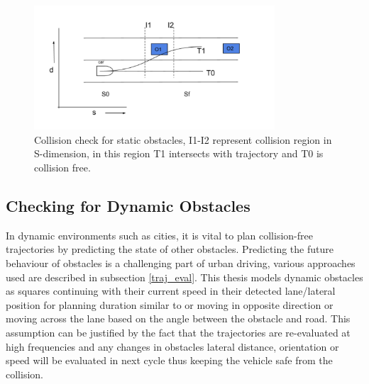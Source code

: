  \begin{figure}
    \centering
    \includegraphics[width=0.8\textwidth]{Images/static_check.png}
    \caption{Collision check for static obstacles, I1-I2 represent collision region in S-dimension, in this region T1 intersects with trajectory and T0 is collision free.}
    \label{static_check}
\end{figure}



\subsection{Checking for Dynamic Obstacles} \label{obstacle_check_dynamic}

In dynamic environments such as cities, it is vital to plan collision-free trajectories by predicting the state of other obstacles. Predicting the future behaviour of obstacles is a challenging part of urban driving, various approaches used are described in subsection \ref{traj_eval}. This thesis models dynamic obstacles as squares continuing with their current speed in their detected lane/lateral position for planning duration similar to \cite{unit_A_star} or moving in opposite direction or moving across the lane based on the angle between the obstacle and road. This assumption can be justified by the fact that the trajectories are re-evaluated at high frequencies and any changes in obstacles lateral distance, orientation or speed will be evaluated in next cycle thus keeping the vehicle safe from the collision. 

